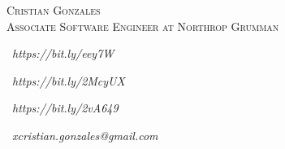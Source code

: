 \documentclass{res}
\begin{document}
\begin{resume}

\begin{center}
\textsc{{\Huge Cristian Gonzales}}\\
\vspace{1mm}
\textsc{\large Associate Software Engineer at Northrop Grumman}\\
\vspace{1mm}
\end{center}

\begin{multicols}{4}
\begin{center}
\faLinkedinSquare\ 
\textit{https://bit.ly/eey7W}
\end{center}
\columnbreak
\begin{center}
\faGithub\ 
\textit{https://bit.ly/2McyUX}
\end{center}
\columnbreak
\begin{center}
\faGlobe\ 
\textit{https://bit.ly/2vA649}
\end{center}
\columnbreak
\faEnvelope\ 
\textit{xcristian.gonzales@gmail.com}
\end{multicols}

\vspace{-3mm}


\end{resume}
\end{document}

